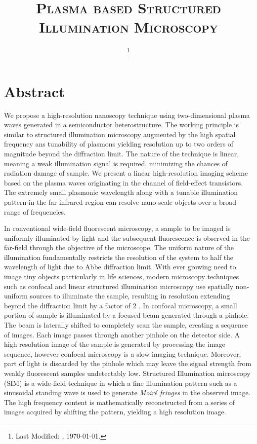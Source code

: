 \documentclass[11pt]{article}
\begin{document}
\title{\textsc{Plasma based Structured Illumination Microscopy}}
\date{\footnote{Last Modified: \currenttime, \today.}}
\maketitle


\section{Abstract}
%
We propose a high-resolution nanoscopy technique using two-dimensional plasma waves generated in a semiconductor heterostructure. The working principle is similar to structured illumination microscopy augmented by the high spatial frequency ans tunability of plasmons yielding resolution up to two orders of magnitude beyond the diffraction limit. The nature of the technique is linear, meaning a weak illumination signal is required, minimizing the chances of radiation damage of sample.
We present a linear high-resolution imaging scheme based on the plasma waves originating in the channel of field-effect transistors. The extremely small plasmonic wavelength along with a tunable illumination pattern in the far infrared region can resolve nano-scale objects over a broad range of frequencies.

In conventional wide-field fluorescent microscopy, a sample to be imaged is uniformly illuminated by light and the subsequent fluorescence is observed in the far-field through the objective of the microscope. The uniform nature of the illumination fundamentally restricts the resolution of the system to half the wavelength of light due to Abbe diffraction limit. With ever growing need to image tiny objects particularly in life sciences, modern microscopy techniques such as confocal and linear structured illumination microscopy use spatially non-uniform sources to illuminate the sample, resulting in resolution extending beyond the diffraction limit by a factor of $2$ \cite{Minsky1988, Gustafsson_2005}. In confocal microscopy, a small portion of sample is illuminated by a focused beam generated through a pinhole. The beam is laterally shifted to completely scan the sample, creating a sequence of images. Each image passes through another pinhole on the detector side. A high resolution image of the sample is generated by processing the image sequence, however confocal microscopy is a slow imaging technique. Moreover, part of light is discarded by the pinhole which may leave the signal strength from weakly fluorescent samples undetectably low. Structured Illumination microscopy (SIM) is a wide-field technique in which a fine illumination pattern such as a sinusoidal standing wave is used to generate \emph{Moiré fringes} in the observed image. The high frequency content is mathematically reconstructed from a series of images acquired by shifting the pattern, yielding a high resolution image.
\end{document}
